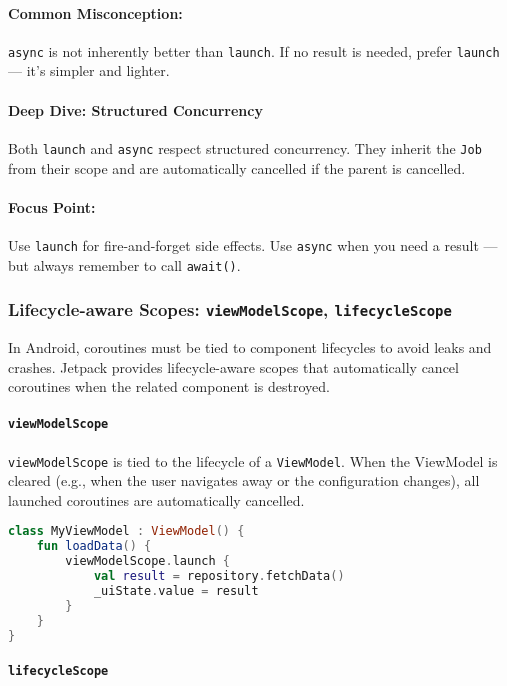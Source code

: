 \documentclass[a4paper,12pt]{article}
\begin{document}
\paragraph{Common Misconception:}  
\texttt{async} is not inherently better than \texttt{launch}. If no result is needed, prefer \texttt{launch} — it’s simpler and lighter.

\paragraph{Deep Dive: Structured Concurrency}  
Both \texttt{launch} and \texttt{async} respect structured concurrency. They inherit the \texttt{Job} from their scope and are automatically cancelled if the parent is cancelled.

\paragraph{Focus Point:}  
Use \texttt{launch} for fire-and-forget side effects. Use \texttt{async} when you need a result — but always remember to call \texttt{await()}.

\subsubsection{Lifecycle-aware Scopes: \texttt{viewModelScope}, \texttt{lifecycleScope}}

In Android, coroutines must be tied to component lifecycles to avoid leaks and crashes. Jetpack provides lifecycle-aware scopes that automatically cancel coroutines when the related component is destroyed.

\paragraph{\texttt{viewModelScope}}

\texttt{viewModelScope} is tied to the lifecycle of a \texttt{ViewModel}. When the ViewModel is cleared (e.g., when the user navigates away or the configuration changes), all launched coroutines are automatically cancelled.

\begin{lstlisting}[language=Kotlin]
class MyViewModel : ViewModel() {
    fun loadData() {
        viewModelScope.launch {
            val result = repository.fetchData()
            _uiState.value = result
        }
    }
}
\end{lstlisting}

\paragraph{\texttt{lifecycleScope}}
\end{document}
